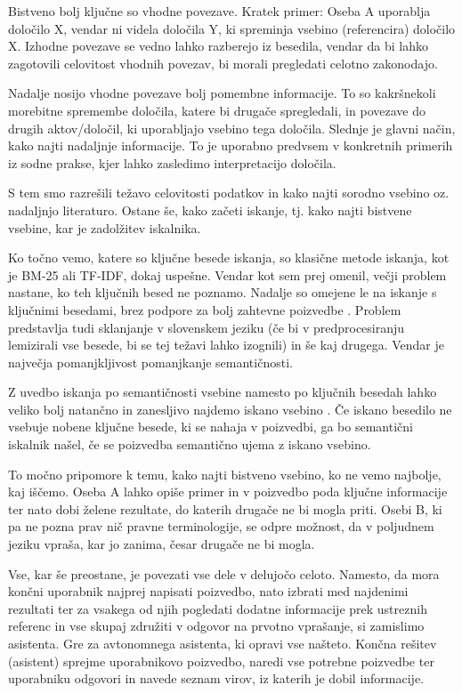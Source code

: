 \documentclass[a4paper,12pt,openright]{book}
\begin{document}
Bistveno bolj ključne so vhodne povezave. Kratek primer: Oseba A uporablja določilo X, vendar ni videla določila Y, ki spreminja vsebino (referencira) določilo X. Izhodne povezave se vedno lahko razberejo iz besedila, vendar da bi lahko zagotovili celovitost vhodnih povezav, bi morali pregledati celotno zakonodajo.

Nadalje nosijo vhodne povezave bolj pomembne informacije. To so kakršnekoli morebitne spremembe določila, katere bi drugače spregledali, in povezave do drugih aktov/določil, ki uporabljajo vsebino tega določila. Slednje je glavni način, kako najti nadaljnje informacije. To je uporabno predvsem v konkretnih primerih iz sodne prakse, kjer lahko zasledimo interpretacijo določila.

S tem smo razrešili težavo celovitosti podatkov in kako najti sorodno vsebino oz. nadaljnjo literaturo. Ostane še, kako začeti iskanje, tj. kako najti bistvene vsebine, kar je zadolžitev iskalnika.

Ko točno vemo, katere so ključne besede iskanja, so klasične metode iskanja, kot je BM-25 ali TF-IDF, dokaj uspešne. Vendar kot sem prej omenil, večji problem nastane, ko teh ključnih besed ne poznamo. Nadalje so omejene le na iskanje s ključnimi besedami, brez podpore za bolj zahtevne poizvedbe \cite{bm25_limitations}. Problem predstavlja tudi sklanjanje v slovenskem jeziku (če bi v predprocesiranju lemizirali vse besede, bi se tej težavi lahko izognili) in še kaj drugega. Vendar je največja pomanjkljivost pomanjkanje semantičnosti.

Z uvedbo iskanja po semantičnosti vsebine namesto po ključnih besedah lahko veliko bolj natančno in zanesljivo najdemo iskano vsebino \cite{bm25_limitations}. Če iskano besedilo ne vsebuje nobene ključne besede, ki se nahaja v poizvedbi, ga bo semantični iskalnik našel, če se poizvedba semantično ujema z iskano vsebino.

To močno pripomore k temu, kako najti bistveno vsebino, ko ne vemo najbolje, kaj iščemo. Oseba A lahko opiše primer in v poizvedbo poda ključne informacije ter nato dobi želene rezultate, do katerih drugače ne bi mogla priti. Osebi B, ki pa ne pozna prav nič pravne terminologije, se odpre možnost, da v poljudnem jeziku vpraša, kar jo zanima, česar drugače ne bi mogla.

Vse, kar še preostane, je povezati vse dele v delujočo celoto. Namesto, da mora končni uporabnik najprej napisati poizvedbo, nato izbrati med najdenimi rezultati ter za vsakega od njih pogledati dodatne informacije prek ustreznih referenc in vse skupaj združiti v odgovor na prvotno vprašanje, si zamislimo asistenta. Gre za avtonomnega asistenta, ki opravi vse našteto. Končna rešitev (asistent) sprejme uporabnikovo poizvedbo, naredi vse potrebne poizvedbe ter uporabniku odgovori in navede seznam virov, iz katerih je dobil informacije.
\end{document}
